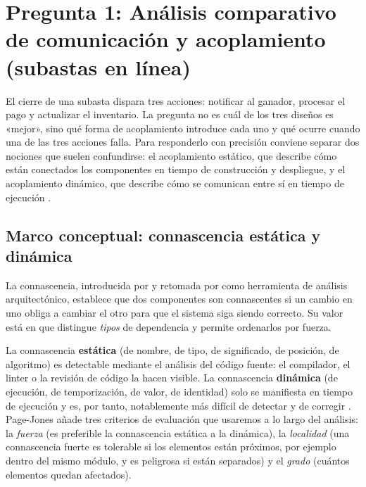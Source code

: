 \section[Pregunta 1: Comunicación y acoplamiento]{Pregunta 1: Análisis comparativo de comunicación y acoplamiento\\(subastas en línea)}


El cierre de una subasta dispara tres acciones: notificar al ganador, procesar el pago y actualizar el inventario. La pregunta no es cuál de los tres diseños es «mejor», sino qué forma de acoplamiento introduce cada uno y qué ocurre cuando una de las tres acciones falla. Para responderlo con precisión conviene separar dos nociones que suelen confundirse: el acoplamiento estático, que describe cómo están conectados los componentes en tiempo de construcción y despliegue, y el acoplamiento dinámico, que describe cómo se comunican entre sí en tiempo de ejecución \parencite{fordhardparts2021}.

\subsection{Marco conceptual: connascencia estática y dinámica}

La connascencia, introducida por \textcite{pagejones1996} y retomada por \textcite{richardsford2020} como herramienta de análisis arquitectónico, establece que dos componentes son connascentes si un cambio en uno obliga a cambiar el otro para que el sistema siga siendo correcto. Su valor está en que distingue \emph{tipos} de dependencia y permite ordenarlos por fuerza.

La connascencia \textbf{estática} (de nombre, de tipo, de significado, de posición, de algoritmo) es detectable mediante el análisis del código fuente: el compilador, el linter o la revisión de código la hacen visible. La connascencia \textbf{dinámica} (de ejecución, de temporización, de valor, de identidad) solo se manifiesta en tiempo de ejecución y es, por tanto, notablemente más difícil de detectar y de corregir \parencite{richardsford2020}. Page-Jones añade tres criterios de evaluación que usaremos a lo largo del análisis: la \emph{fuerza} (es preferible la connascencia estática a la dinámica), la \emph{localidad} (una connascencia fuerte es tolerable si los elementos están próximos, por ejemplo dentro del mismo módulo, y es peligrosa si están separados) y el \emph{grado} (cuántos elementos quedan afectados).

